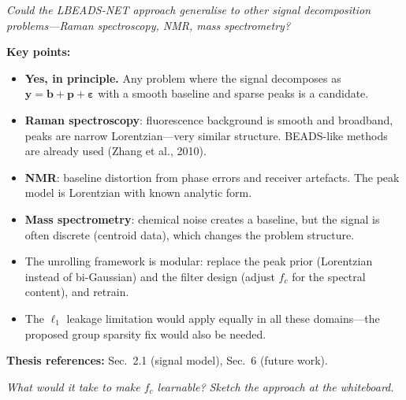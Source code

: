 \documentclass[11pt, letterpaper]{article}
\newcounter{qcounter}
\newcommand{\question}[1]{%
  \stepcounter{qcounter}%
  \begin{questionbox}[Q\theqcounter]%
    \itshape #1%
  \end{questionbox}%
}
\begin{document}
\question{Could the LBEADS-NET approach generalise to other signal
decomposition problems---Raman spectroscopy, NMR, mass
spectrometry?}

\begin{answerbox}
\textbf{Key points:}
\begin{itemize}[nosep]
  \item \textbf{Yes, in principle.}  Any problem where the signal
        decomposes as $\mathbf{y} = \mathbf{b} + \mathbf{p} +
        \boldsymbol{\varepsilon}$ with a smooth baseline and sparse
        peaks is a candidate.
  \item \textbf{Raman spectroscopy}: fluorescence background is
        smooth and broadband, peaks are narrow Lorentzian---very
        similar structure.  BEADS-like methods are already used
        (Zhang et al., 2010).
  \item \textbf{NMR}: baseline distortion from phase errors and
        receiver artefacts.  The peak model is Lorentzian with
        known analytic form.
  \item \textbf{Mass spectrometry}: chemical noise creates a
        baseline, but the signal is often discrete (centroid data),
        which changes the problem structure.
  \item The unrolling framework is modular: replace the peak prior
        (Lorentzian instead of bi-Gaussian) and the filter design
        (adjust $f_c$ for the spectral content), and retrain.
  \item The $\ell_1$ leakage limitation would apply equally in
        all these domains---the proposed group sparsity fix would
        also be needed.
\end{itemize}
\textbf{Thesis references:} Sec.~2.1 (signal model), Sec.~6 (future work).
\end{answerbox}

\question{What would it take to make $f_c$ learnable?  Sketch the approach
at the whiteboard.}
\end{document}
